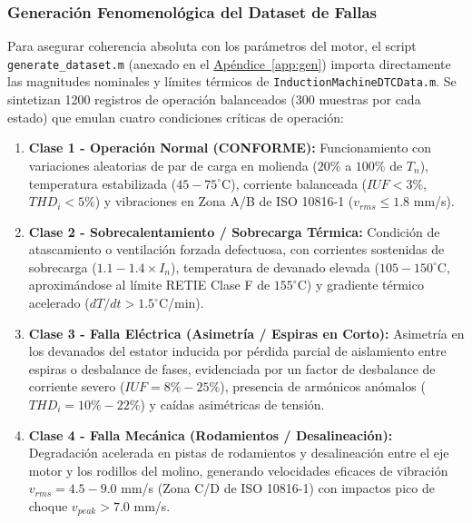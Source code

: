 \documentclass[conference]{IEEEtran}
\begin{document}
\subsubsection{Generación Fenomenológica del Dataset de Fallas}
Para asegurar coherencia absoluta con los parámetros del motor, el script \texttt{generate\_dataset.m} (anexado en el \hyperref[app:gen]{Apéndice~\ref*{app:gen}}) importa directamente las magnitudes nominales y límites térmicos de \texttt{InductionMachineDTCData.m}. Se sintetizan 1200 registros de operación balanceados (300 muestras por cada estado) que emulan cuatro condiciones críticas de operación:
\begin{enumerate}
    \item \textbf{Clase 1 - Operación Normal (CONFORME):} Funcionamiento con variaciones aleatorias de par de carga en molienda ($20\%$ a $100\%$ de $T_n$), temperatura estabilizada ($45 - 75^\circ$C), corriente balanceada ($IUF < 3\%$, $THD_i < 5\%$) y vibraciones en Zona A/B de ISO 10816-1 ($v_{rms} \le 1.8$ mm/s).
    \item \textbf{Clase 2 - Sobrecalentamiento / Sobrecarga Térmica:} Condición de atascamiento o ventilación forzada defectuosa, con corrientes sostenidas de sobrecarga ($1.1 - 1.4 \times I_n$), temperatura de devanado elevada ($105 - 150^\circ$C, aproximándose al límite RETIE Clase F de $155^\circ$C) y gradiente térmico acelerado ($dT/dt > 1.5^\circ$C/min).
    \item \textbf{Clase 3 - Falla Eléctrica (Asimetría / Espiras en Corto):} Asimetría en los devanados del estator inducida por pérdida parcial de aislamiento entre espiras o desbalance de fases, evidenciada por un factor de desbalance de corriente severo ($IUF = 8\% - 25\%$), presencia de armónicos anómalos ($THD_i = 10\% - 22\%$) y caídas asimétricas de tensión.
    \item \textbf{Clase 4 - Falla Mecánica (Rodamientos / Desalineación):} Degradación acelerada en pistas de rodamientos y desalineación entre el eje motor y los rodillos del molino, generando velocidades eficaces de vibración $v_{rms} = 4.5 - 9.0$ mm/s (Zona C/D de ISO 10816-1) con impactos pico de choque $v_{peak} > 7.0$ mm/s.
\end{enumerate}
\end{document}
